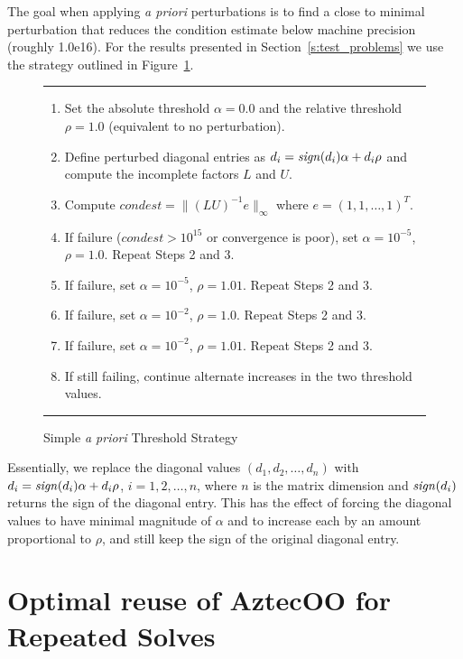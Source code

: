 \documentclass[12pt,relax]{AztecOOUserGuide}
\newcommand{\sign}{{\it sign}}
\begin{document}
The goal when applying {\it a priori} perturbations is to find a close to minimal
perturbation that reduces the condition estimate below machine
precision (roughly 1.0e16).  For the results presented in
Section~\ref{s:test_problems} we use the strategy outlined in
Figure~\ref{f:aprioristrategy}.
{\small
\begin{figure}
\vspace{.05in}
\hrule
\vspace{.1in}
\begin{enumerate}
\item Set the absolute threshold $\alpha = 0.0$ and the relative
threshold $\rho = 1.0$ (equivalent to no perturbation).
\item Define perturbed diagonal entries as $d_{i} = \sign(d_i)\alpha +
d_i\rho$ and compute the incomplete factors $L$ and $U$.
\item Compute $condest = \|(LU)^{-1}e\|_\infty$ where $e = (1, 1,
\ldots, 1)^T$.
\item If failure ($condest > 10^{15}$ or convergence is poor), set $\alpha =
10^{-5}$, $\rho = 1.0$.  Repeat Steps 2 and 3.
\item If failure, set $\alpha =
10^{-5}$, $\rho = 1.01$. Repeat Steps 2 and 3.
\item If failure, set $\alpha =
10^{-2}$, $\rho = 1.0$. Repeat Steps 2 and 3.
\item If failure, set $\alpha =
10^{-2}$, $\rho = 1.01$. Repeat Steps 2 and 3.
\item If still failing, continue alternate increases in
   the two threshold values.
\end{enumerate}
\vspace{.1in}
\hrule
\caption{Simple {\it a priori} Threshold Strategy}
\label{f:aprioristrategy}
\end{figure}
}
Essentially, we replace the diagonal values $(d_1, d_2, \ldots, d_n)$
with $d_i = \sign(d_i)\alpha + d_i\rho$, $i=1, 2, \ldots, n$, where
$n$ is the matrix dimension and $\sign(d_i)$ returns
the sign of the diagonal entry.  This has the effect of
forcing the diagonal values to have minimal magnitude of $\alpha$ and
to increase each by an amount proportional to $\rho$, and still keep
the sign of the original diagonal entry.


\section {Optimal reuse of AztecOO for Repeated Solves}
\end{document}
